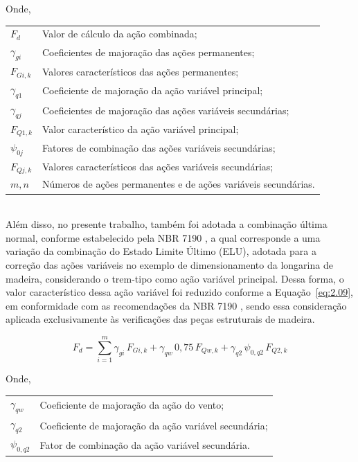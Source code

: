 Onde,

\begin{tabular}{ll}
$F_d$ & Valor de cálculo da ação combinada;\\
$\gamma_{gi}$ & Coeficientes de majoração das ações permanentes;\\
$F_{G i,k}$ & Valores característicos das ações permanentes;\\
$\gamma_{q1}$ & Coeficiente de majoração da ação variável principal;\\
$\gamma_{qj}$ & Coeficientes de majoração das ações variáveis secundárias;\\
$F_{Q1,k}$ & Valor característico da ação variável principal;\\
$\psi_{0j}$ & Fatores de combinação das ações variáveis secundárias;\\
$F_{Qj,k}$ & Valores característicos das ações variáveis secundárias;\\
$m,n$ & Números de ações permanentes e de ações variáveis secundárias.
\end{tabular}
\\

Além disso, no presente trabalho, também foi adotada a combinação última normal, conforme estabelecido pela NBR 7190 \parencite{NBR7190-1:2022}, a qual corresponde a uma variação da combinação do Estado Limite Último (ELU), adotada para a correção das ações variáveis no exemplo de dimensionamento da longarina de madeira, considerando o trem-tipo como ação variável principal. Dessa forma, o valor característico dessa ação variável foi reduzido conforme a Equação~\eqref{eq:2.09}, em conformidade com as recomendações da NBR 7190 \parencite{NBR7190-1:2022}, sendo essa consideração aplicada exclusivamente às verificações das peças estruturais de madeira.

\begin{equation}
      F_d = \sum_{i=1}^{m} \gamma_{gi}\, F_{Gi,k}
      + \gamma_{qw}\, 0{,}75\, F_{Qw,k}
      + \gamma_{q2}\, \psi_{0,q2}\, F_{Q2,k}
      \label{eq:2.09}
\end{equation}

Onde,

\begin{tabular}{ll}
$\gamma_{qw}$ & Coeficiente de majoração da ação do vento;\\
$\gamma_{q2}$ & Coeficiente de majoração da ação variável secundária;\\
$\psi_{0,q2}$ & Fator de combinação da ação variável secundária.
\end{tabular}


